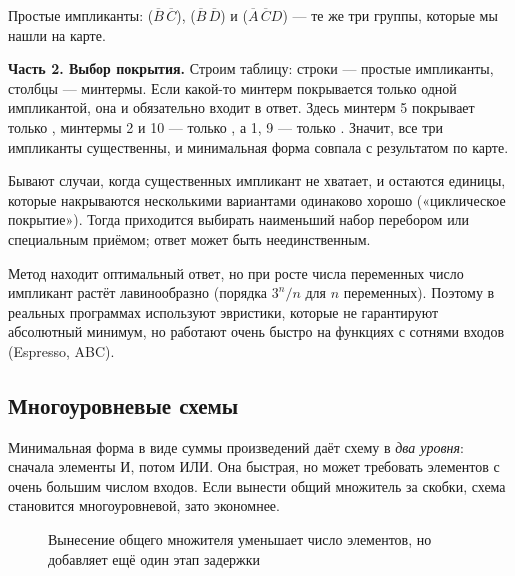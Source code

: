 Простые импликанты:  ($\overline{B}\,\overline{C}$), 
($\overline{B}\,\overline{D}$) и  ($\overline{A}\,\overline{C}D$)
--- те же три группы, которые мы нашли на карте.

\textbf{Часть 2. Выбор покрытия.} Строим таблицу: строки --- простые
импликанты, столбцы --- минтермы. Если какой-то минтерм покрывается только
одной импликантой, она  и обязательно входит в ответ.
Здесь минтерм 5 покрывает только , минтермы 2 и 10 --- только
, а 1, 9 --- только . Значит, все три импликанты
существенны, и минимальная форма совпала с результатом по карте.

Бывают случаи, когда существенных импликант не хватает, и остаются
единицы, которые накрываются несколькими вариантами одинаково хорошо
(«циклическое покрытие»). Тогда приходится выбирать наименьший набор
перебором или специальным приёмом; ответ может быть неединственным.

Метод находит оптимальный ответ, но при росте числа переменных число
импликант растёт лавинообразно (порядка $3^n/n$ для $n$ переменных). Поэтому
в реальных программах используют эвристики, которые не гарантируют
абсолютный минимум, но работают очень быстро на функциях с сотнями входов
(Espresso, ABC).

\subsection{Многоуровневые схемы}

Минимальная форма в виде суммы произведений даёт схему в \emph{два уровня}:
сначала элементы И, потом ИЛИ. Она быстрая, но может требовать элементов с
очень большим числом входов. Если вынести общий множитель за скобки, схема
становится многоуровневой, зато экономнее.

\begin{figure}[H]
\centering
{}
\caption{Вынесение общего множителя уменьшает число элементов, но добавляет ещё один этап задержки}
\end{figure}

